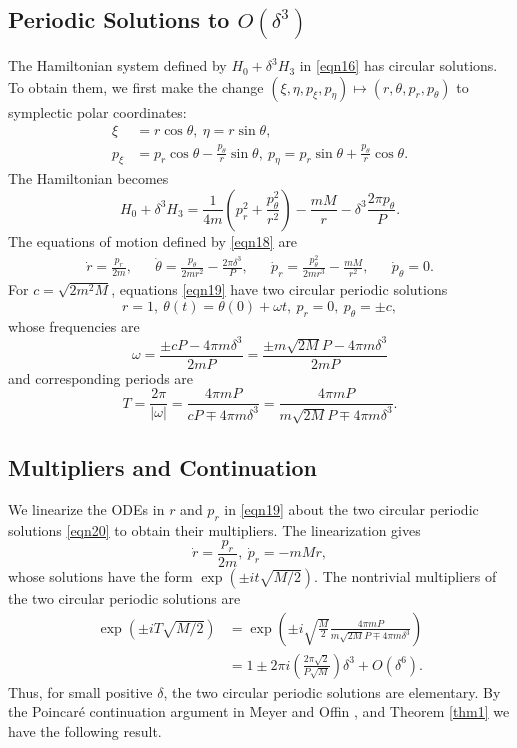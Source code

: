 \documentclass[12pt]{article}
\begin{document}
\subsection{Periodic Solutions to $O(\delta^3)$}
The Hamiltonian system defined by $H_0 + \delta^3H_3$ in \eqref{eqn16} has circular solutions. To obtain them, we first make the change $(\xi,\eta,p_\xi,p_\eta) \mapsto (r,\theta,p_r,p_\theta)$ to symplectic polar coordinates:
\begin{align*}
\xi & = r\cos \theta,\ \eta = r\sin\theta, \\
p_\xi & = p_r\cos\theta - \frac{p_\theta}{r}\sin\theta,\ p_\eta = p_r\sin\theta + \frac{p_\theta}{r}\cos\theta.
\end{align*}
The Hamiltonian becomes
\begin{equation}
    H_0 + \delta^3H_3 = \frac{1}{4m}\left(p_r^2 + \frac{p_\theta^2}{r^2}\right) - \frac{mM}{r} - \delta^3\frac{2\pi p_\theta}{P}.
    \label{eqn18}
\end{equation}
The equations of motion defined by \eqref{eqn18} are
\begin{align}
    \dot{r} = \frac{p_r}{2m}, & & \dot{\theta} = \frac{p_\theta}{2mr^2} - \frac{2\pi\delta^3}{P}, & & \dot{p}_r = \frac{p_\theta^2}{2mr^3} - \frac{mM}{r^2}, & & \dot{p}_\theta = 0.
    \label{eqn19}
\end{align}
For $c = \sqrt{2m^2M}$, equations \eqref{eqn19} have two circular periodic solutions
\begin{equation}\label{eqn20}
r = 1,\ \theta(t) = \theta(0) + \omega t,\ p_r = 0,\ p_\theta = \pm c,
\end{equation}
whose frequencies are
\[ \omega = \frac{\pm cP - 4\pi m \delta^3}{2mP} = \frac{\pm m\sqrt{2M}P - 4\pi m \delta^3}{2m P} \]
and corresponding periods are
\begin{equation}\label{eqn21}
 T = \frac{2\pi}{\vert \omega\vert} = \frac{ 4\pi m P}{ cP \mp 4\pi m\delta^3} = \frac{4\pi m P}{ m\sqrt{2M}P \mp 4\pi m \delta^3}.
\end{equation}



\subsection{Multipliers and Continuation}
We linearize the ODEs in $r$ and $p_r$ in \eqref{eqn19} about the two circular periodic solutions \eqref{eqn20} to obtain their multipliers. The linearization gives
\[ \dot r = \frac{p_r}{2m},\ \dot p_r = -mM r,\]
whose solutions have the form $\exp(\pm i t\sqrt{M/2})$. The nontrivial multipliers of the two circular periodic solutions are
\begin{align*} 
\exp(\pm i T\sqrt{M/2})
& =  \exp\left( \pm i \sqrt{ \frac{M}{2}} \frac{4\pi m P}{m\sqrt{2M}P \mp 4\pi m \delta^3}\right) \\
& = 1 \pm 2\pi i \left( \frac{2\pi \sqrt{2}} {P\sqrt{M}}\right)\delta^3 + O(\delta^6).
\end{align*}
Thus, for small positive $\delta$, the two circular periodic solutions are elementary. By the Poincar\'e continuation argument in Meyer and Offin \cite{meyerOffin}, and Theorem \ref{thm1} we have the following result.
\end{document}
